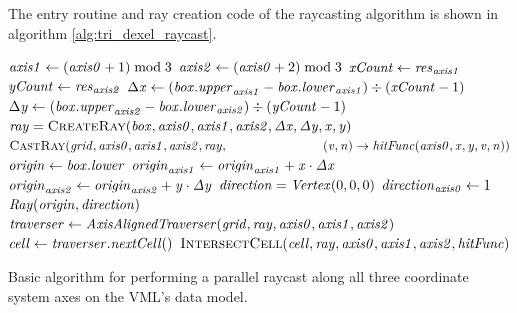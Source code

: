 The entry routine and ray creation code of the raycasting algorithm is shown in algorithm \ref{alg:tri_dexel_raycast}.
%
\begin{algorithm}
	\centering
	\begin{algorithmic}[1]
				\State $\mathit{axis1} \gets (\mathit{axis0} + 1) \bmod 3$
				\State $\mathit{axis2} \gets (\mathit{axis0} + 2) \bmod 3$
				\State $\mathit{xCount} \gets \mathit{res}_{\mathit{axis1}}$
				\State $\mathit{yCount} \gets \mathit{res}_{\mathit{axis2}}$
				\State $\Delta \mathit{x} \gets (\mathit{box}.\mathit{upper}_{\mathit{axis1}} - \mathit{box}.\mathit{lower}_{\mathit{axis1}}) \div (\mathit{xCount} - 1)$
				\State $\Delta \mathit{y} \gets (\mathit{box}.\mathit{upper}_{\mathit{axis2}} - \mathit{box}.\mathit{lower}_{\mathit{axis2}}) \div (\mathit{yCount} - 1)$
						\State $\var{ray} = \Call{CreateRay}{\var{box}, \var{axis0}, \var{axis1}, \var{axis2}, \var{\Delta x}, \var{\Delta y}, \var{x}, \var{y}}$
						\State $\Call{CastRay}{\var{grid}, \var{axis0}, \var{axis1}, \var{axis2}, \var{ray},\hfill\break
							\hspace*{\dimexpr\algorithmicindent*5}(\var{v}, \var{n}) \rightarrow \var{hitFunc}(\var{axis0}, \var{x}, \var{y}, \var{v}, \var{n})}$
					\EndFor
				\EndFor
			\EndFor
		\EndProcedure
		\\
			\State $\mathit{origin} \gets \mathit{box}.\mathit{lower}$
			\State $\mathit{origin}_{\mathit{axis1}} \gets \mathit{origin}_{\mathit{axis1}} + \mathit{x} \cdot \mathit{\Delta x}$
			\State $\mathit{origin}_{\mathit{axis2}} \gets \mathit{origin}_{\mathit{axis2}} + \mathit{y} \cdot \mathit{\Delta y}$
			\State $\mathit{direction} = \mathit{Vertex}(0, 0, 0)$
			\State $\mathit{direction}_{\mathit{axis0}} \gets 1$
			\State \Return $\mathit{Ray}(\mathit{origin}, \mathit{direction})$
		\EndFunction
		\\
			\State $\mathit{traverser} \gets \mathit{AxisAlignedTraverser}(\mathit{grid}, \mathit{ray}, \mathit{axis0}, \mathit{axis1}, \mathit{axis2})$
				\State $\mathit{cell} \gets \mathit{traverser}.\mathit{nextCell}()$
				\State $\Call{IntersectCell}{\var{cell}, \var{ray}, \var{axis0}, \var{axis1}, \var{axis2}, \var{hitFunc}}$
			\EndWhile
		\EndProcedure
	\end{algorithmic}
	\caption{
		Basic algorithm for performing a parallel raycast along all three coordinate system axes on the VML's data model.
	}
	\label{alg:tri_dexel_raycast}
\end{algorithm}
